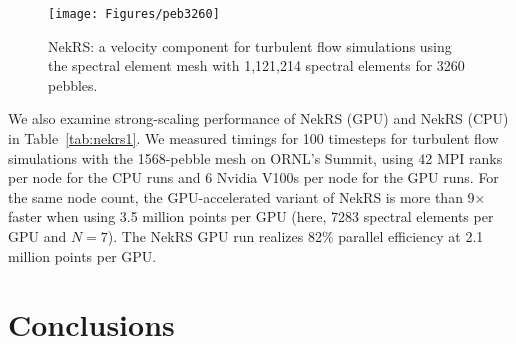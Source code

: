 \documentclass{anstrans}
\begin{document}
\begin{figure}[!h]
\centering
\texttt{[image: Figures/peb3260]}
\caption{NekRS: a velocity component for turbulent flow simulations using the
spectral element mesh with 1,121,214 spectral elements for 3260 pebbles. }
\label{f:ndemo4}
\end{figure}

We also examine strong-scaling performance of NekRS (GPU) and NekRS
(CPU) in Table~\ref{tab:nekrs1}.  We measured timings for 100 timesteps for
turbulent flow simulations with the 1568-pebble mesh on ORNL's Summit, using 42
MPI ranks per node for the CPU runs and 6 Nvidia V100s per node for the GPU
runs.  For the same node count, the GPU-accelerated variant of NekRS is more
than 9$\times$ faster when using 3.5 million points per GPU (here, 7283
spectral elements per GPU and $N=7$).  The NekRS GPU run realizes 82\%
parallel efficiency at 2.1 million points per GPU.

\begin{table}
  \caption{NekRS GPU/CPU Strong-Scale Timings (seconds per step) for 100 Steps of Turbulent flow Simulations
   with $Re=10000$ for 1568-Pebble Case Using Total Number of Grid Points $n=179,864,398$ ($E=524,386$ and $N=7$).}
  \label{tab:nekrs1}
\end{table}

\section{Conclusions}
\end{document}
